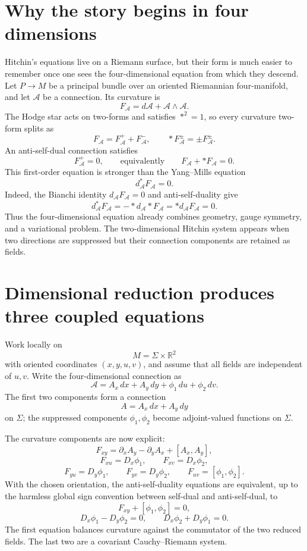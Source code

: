 
\section{Why the story begins in four dimensions}

Hitchin's equations live on a Riemann surface, but their form is much easier to remember once one sees the four-dimensional equation from which they descend.  Let \(P\to M\) be a principal bundle over an oriented Riemannian four-manifold, and let \(\mathcal A\) be a connection.  Its curvature is
\[
  F_{\mathcal A}=d\mathcal A+\mathcal A\wedge\mathcal A.
\]
The Hodge star acts on two-forms and satisfies \(*^2=1\), so every curvature two-form splits as
\[
  F_{\mathcal A}=F_{\mathcal A}^{+}+F_{\mathcal A}^{-},
  \qquad
  *F_{\mathcal A}^{\pm}=\pm F_{\mathcal A}^{\pm}.
\]
An anti-self-dual connection satisfies
\[
  F_{\mathcal A}^{+}=0,
  \qquad\text{equivalently}\qquad
  F_{\mathcal A}+*F_{\mathcal A}=0.
\]
This first-order equation is stronger than the Yang--Mills equation
\[
  d_{\mathcal A}^{*}F_{\mathcal A}=0.
\]
Indeed, the Bianchi identity \(d_{\mathcal A}F_{\mathcal A}=0\) and anti-self-duality give
\[
  d_{\mathcal A}^{*}F_{\mathcal A}
  =-*d_{\mathcal A}*F_{\mathcal A}
  =*d_{\mathcal A}F_{\mathcal A}=0.
\]
Thus the four-dimensional equation already combines geometry, gauge symmetry, and a variational problem.  The two-dimensional Hitchin system appears when two directions are suppressed but their connection components are retained as fields.

\section{Dimensional reduction produces three coupled equations}

Work locally on
\[
  M=\Sigma\times\mathbb R^2
\]
with oriented coordinates \((x,y,u,v)\), and assume that all fields are independent of \(u,v\).  Write the four-dimensional connection as
\[
  \mathcal A
  =A_x\,dx+A_y\,dy+\phi_1\,du+\phi_2\,dv.
\]
The first two components form a connection
\[
  A=A_x\,dx+A_y\,dy
\]
on \(\Sigma\); the suppressed components \(\phi_1,\phi_2\) become adjoint-valued functions on \(\Sigma\).

The curvature components are now explicit:
\[
  F_{xy}=\partial_xA_y-\partial_yA_x+[A_x,A_y],
\]
\[
  F_{xu}=D_x\phi_1,
  \qquad
  F_{xv}=D_x\phi_2,
\]
\[
  F_{yu}=D_y\phi_1,
  \qquad
  F_{yv}=D_y\phi_2,
  \qquad
  F_{uv}=[\phi_1,\phi_2].
\]
With the chosen orientation, the anti-self-duality equations are equivalent, up to the harmless global sign convention between self-dual and anti-self-dual, to
\[
  F_{xy}+[\phi_1,\phi_2]=0,
\]
\[
  D_x\phi_1-D_y\phi_2=0,
  \qquad
  D_x\phi_2+D_y\phi_1=0.
\]
The first equation balances curvature against the commutator of the two reduced fields.  The last two are a covariant Cauchy--Riemann system.

